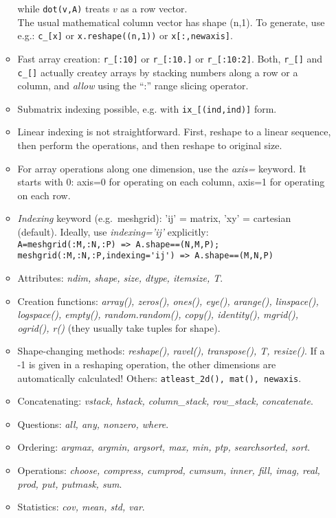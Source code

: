 \documentclass[10pt]{article}
\begin{document}
\begin{enumerate}
\begin{itemize}
    while \verb|dot(v,A)| treats $v$ as a row vector.\\
    The usual mathematical column vector has shape (n,1). To generate,
    use e.g.: \verb|c_[x]| or \verb|x.reshape((n,1))| or \verb|x[:,newaxis]|.
  \item Fast array creation: \verb|r_[:10]| or \verb|r_[:10.]| or
    \verb|r_[:10:2]|. Both, \verb|r_[]| and \verb|c_[]| actually
    createy arrays by stacking numbers along a row or a column, and
    \emph{allow} using the ``:'' range slicing operator.
  \item Submatrix indexing possible, e.g. with \verb|ix_[(ind,ind)]| form.
  \item Linear indexing is not straightforward. First, reshape to a
    linear sequence, then perform the operations, and then reshape to
    original size.
  \item For array operations along one dimension, use the \emph{axis=}
    keyword. It starts with 0: axis=0 for operating on each column,
    axis=1 for operating on each row.
  \item \emph{Indexing} keyword (e.g.\ meshgrid): 'ij' = matrix, 'xy'
    = cartesian (default). Ideally, use \emph{indexing='ij'}
    explicitly:\\
    \verb|A=meshgrid(:M,:N,:P) => A.shape==(N,M,P); meshgrid(:M,:N,:P,indexing='ij') => A.shape==(M,N,P)|
  \item Attributes: \emph{ndim, shape, size, dtype,
      itemsize, T}.
  \item Creation functions: \emph{array(), zeros(), ones(),
      eye(), arange(), linspace(), logspace(), empty(),
      random.random(), copy(), identity(), mgrid(), ogrid(), r()}
    (they usually take tuples for shape).
  \item Shape-changing methods: \emph{reshape(), ravel(), transpose(),
      T, resize()}. If a -1 is given in a reshaping operation, the
    other dimensions are automatically calculated! Others:
    \verb|atleast_2d(), mat(), newaxis|.
  \item Concatenating: \emph{vstack, hstack, column\_stack, row\_stack,
      concatenate}.
  \item Questions: \emph{all, any, nonzero, where}.
  \item Ordering: \emph{argmax, argmin, argsort, max, min, ptp,
      searchsorted, sort}.
  \item Operations: \emph{choose, compress, cumprod, cumsum, inner,
      fill, imag, real, prod, put, putmask, sum}.
  \item Statistics: \emph{cov, mean, std, var}.

\end{itemize}
\end{enumerate}
\end{document}
